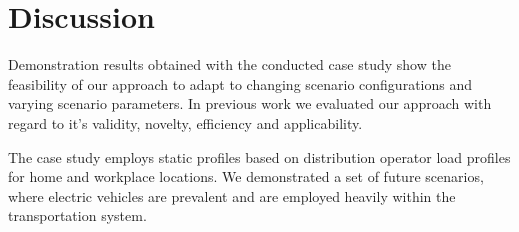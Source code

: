 \section{Discussion}
\label{discussion}



Demonstration results obtained with the conducted case study show the feasibility of our approach to adapt to changing scenario configurations and varying scenario parameters.
In previous work \cite{ascher2015integrated} we evaluated our approach with regard to it's validity, novelty, efficiency and applicability. 

The case study employs static profiles based on distribution operator load profiles for home and workplace locations. We demonstrated a set of future scenarios, where electric vehicles are prevalent and are employed heavily within the transportation system. 
